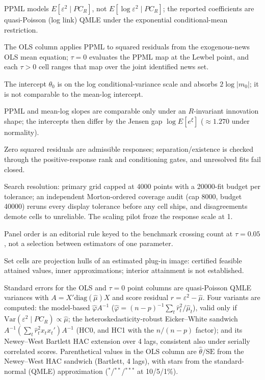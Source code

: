 \begin{table}[!htbp]
\begin{threeparttable}
\begin{tablenotes}[flushleft]
\item PPML models $E[\varepsilon^2 \mid PC_R]$, not $E[\log \varepsilon^2 \mid PC_R]$; the reported coefficients are quasi-Poisson (log link) QMLE under the exponential conditional-mean restriction.
\item The OLS column applies PPML to squared residuals from the exogenous-news OLS mean equation; $\tau{=}0$ evaluates the PPML map at the Lewbel point, and each $\tau{>}0$ cell ranges that map over the joint identified news set.
\item The intercept $\theta_0$ is on the log conditional-variance scale and absorbs $2\log|m_0|$; it is not comparable to the mean-log intercept.
\item PPML and mean-log slopes are comparable only under an $R$-invariant innovation shape; the intercepts then differ by the Jensen gap $\log E[e^{\xi}]$ ($\approx 1.270$ under normality).
\item Zero squared residuals are admissible responses; separation/existence is checked through the positive-response rank and conditioning gates, and unresolved fits fail closed.
\item Search resolution: primary grid capped at 4000 points with a 20000-fit budget per tolerance; an independent Morton-ordered coverage audit (cap 8000, budget 40000) reruns every display tolerance before any cell ships, and disagreements demote cells to unreliable. The scaling pilot froze the response scale at 1.
\item Panel order is an editorial rule keyed to the benchmark crossing count at $\tau{=}0.05$, not a selection between estimators of one parameter.
\item Set cells are projection hulls of an estimated plug-in image: certified feasible attained values, inner approximations; interior attainment is not established.
\item Standard errors for the OLS and $\tau{=}0$ point columns are quasi-Poisson QMLE variances with $A = X'\mathrm{diag}(\hat\mu)X$ and score residual $\hat r = \varepsilon^2 - \hat\mu$. Four variants are computed: the model-based $\hat\varphi A^{-1}$ ($\hat\varphi = (n{-}p)^{-1}\sum_t \hat r_t^2/\hat\mu_t$), valid only if $\mathrm{Var}(\varepsilon^2 \mid PC_R) \propto \hat\mu$; the heteroskedasticity-robust Eicker--White sandwich $A^{-1}(\sum_t \hat r_t^2 x_t x_t')A^{-1}$ (HC0, and HC1 with the $n/(n{-}p)$ factor); and its Newey--West Bartlett HAC extension over 4 lags, consistent also under serially correlated scores. Parenthetical values in the OLS column are $\hat\theta/\mathrm{SE}$ from the Newey--West HAC sandwich (Bartlett, 4 lags), with stars from the standard-normal (QMLE) approximation ($^{*}$/$^{**}$/$^{***}$ at 10/5/1\%).

\end{tablenotes}
\end{threeparttable}
\end{table}
